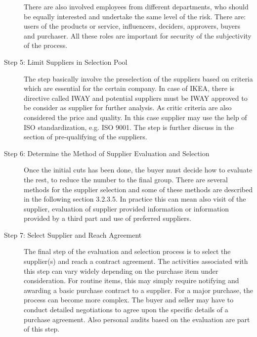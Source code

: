 \documentclass[oneside,12pt]{article}%
\begin{document}
\begin{description}
\begin{itemize}
  \end{itemize}
  There are also involved employees from different departments, who should be equally interested and undertake the same level of the risk. There are: users of the products or service, influencers, deciders, approvers, buyers and purchaser. All these roles are important for security of the subjectivity of the process.


  \item[Step 5: Limit Suppliers in Selection Pool]

  The step basically involve the preselection of the suppliers based on criteria which are essential for the certain company. In case of IKEA, there is directive called IWAY and potential suppliers must be IWAY approved to be consider as supplier for further analysis. As critic criteria are also considered the price and quality. In this case supplier may use the help of ISO standardization, e.g. ISO 9001. The step is further discuss in the section of pre-qualifying of the suppliers.

  \item[Step 6: Determine the Method of Supplier Evaluation and Selection]
  Once the initial cuts has been done, the buyer must decide how to evaluate the rest, to reduce the number to the final group. There are several methods for the supplier selection and some of these methods are described in the following section 3.2.3.5. In practice this can mean also visit of the supplier, evaluation of supplier provided information or information provided by a third part and use of preferred suppliers.

  \item[Step 7: Select Supplier and Reach Agreement]
  The final step of the evaluation and selection process is to select the supplier(s) and reach a contract agreement. The activities associated with this step can vary widely depending on the purchase item under consideration. For routine items, this may simply require notifying and awarding a basic purchase contract to a supplier. For a major purchase, the process can become more complex. The buyer and seller may have to conduct detailed negotiations to agree upon the specific details of a purchase agreement. Also personal audits based on the evaluation are part of this step.

\end{description}
\end{document}
